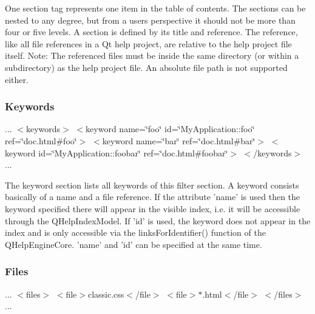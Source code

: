 One section tag represents one item in the table of contents. The sections can be nested to any degree, but from a users perspective it should not be more than four or five levels. A section is defined by its title and reference. The reference, like all file references in a Qt help project, are relative to the help project file itself. Note\-: The referenced files must be inside the same directory (or within a subdirectory) as the help project file. An absolute file path is not supported either.\hypertarget{helpproject_helpproject-kewords}{}\subsubsection{Keywords}\label{helpproject_helpproject-kewords}
... $<$keywords$>$ $<$keyword name=\char`\"{}foo\char`\"{} id=\char`\"{}\-My\-Application\-::foo\char`\"{} ref=\char`\"{}doc.\-html\#foo\char`\"{}$>$ $<$keyword name=\char`\"{}bar\char`\"{} ref=\char`\"{}doc.\-html\#bar\char`\"{}$>$ $<$keyword id=\char`\"{}\-My\-Application\-::foobar\char`\"{} ref=\char`\"{}doc.\-html\#foobar\char`\"{}$>$ $<$/keywords$>$ ...

The keyword section lists all keywords of this filter section. A keyword consists basically of a name and a file reference. If the attribute 'name' is used then the keyword specified there will appear in the visible index, i.\-e. it will be accessible through the Q\-Help\-Index\-Model. If 'id' is used, the keyword does not appear in the index and is only accessible via the links\-For\-Identifier() function of the Q\-Help\-Engine\-Core. 'name' and 'id' can be specified at the same time.\hypertarget{helpproject_helpproject_files}{}\subsubsection{Files}\label{helpproject_helpproject_files}
... $<$files$>$ $<$file$>$classic.\-css$<$/file$>$ $<$file$>$$\ast$.html$<$/file$>$ $<$/files$>$ ...

